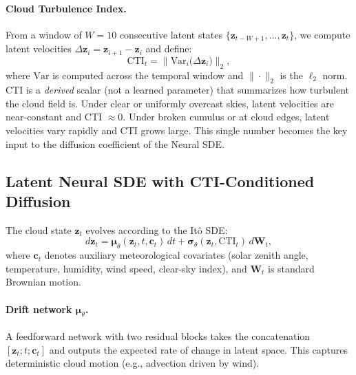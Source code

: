 \documentclass{article}
\begin{document}
\paragraph{Cloud Turbulence Index.}
From a window of $W = 10$ consecutive latent states $\{\mathbf{z}_{t-W+1}, \ldots, \mathbf{z}_t\}$, we compute latent velocities $\Delta\mathbf{z}_i = \mathbf{z}_{i+1} - \mathbf{z}_i$ and define:
\begin{equation}
    \text{CTI}_t = \big\|\text{Var}_{i}\big(\Delta\mathbf{z}_i\big)\big\|_2,
\end{equation}
where $\text{Var}$ is computed across the temporal window and $\|\cdot\|_2$ is the $\ell_2$ norm. CTI is a \emph{derived} scalar (not a learned parameter) that summarizes how turbulent the cloud field is. Under clear or uniformly overcast skies, latent velocities are near-constant and CTI $\approx 0$. Under broken cumulus or at cloud edges, latent velocities vary rapidly and CTI grows large. This single number becomes the key input to the diffusion coefficient of the Neural SDE.

\subsection{Latent Neural SDE with CTI-Conditioned Diffusion}
\label{sec:sde}

The cloud state $\mathbf{z}_t$ evolves according to the It\^{o} SDE:
\begin{equation}
\label{eq:sde}
    d\mathbf{z}_t = \boldsymbol{\mu}_\theta(\mathbf{z}_t, t, \mathbf{c}_t)\,dt + \boldsymbol{\sigma}_\theta(\mathbf{z}_t, \text{CTI}_t)\,d\mathbf{W}_t,
\end{equation}
where $\mathbf{c}_t$ denotes auxiliary meteorological covariates (solar zenith angle, temperature, humidity, wind speed, clear-sky index), and $\mathbf{W}_t$ is standard Brownian motion.

\paragraph{Drift network $\boldsymbol{\mu}_\theta$.}
A feedforward network with two residual blocks takes the concatenation $[\mathbf{z}_t; t; \mathbf{c}_t]$ and outputs the expected rate of change in latent space. This captures deterministic cloud motion (e.g., advection driven by wind).
\end{document}
